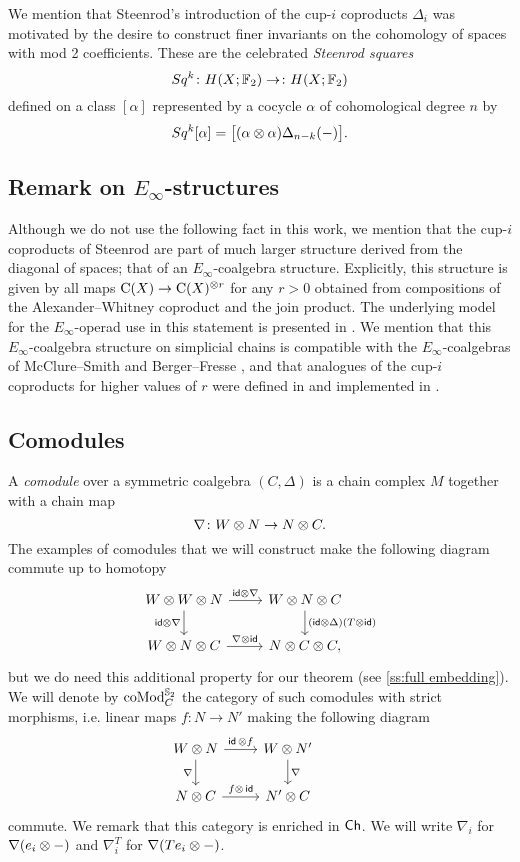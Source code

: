 We mention that Steenrod's introduction of the cup-$i$ coproducts $\Delta_i$ was motivated by the desire to construct finer invariants on the cohomology of spaces with mod 2 coefficients.
These are the celebrated \textit{Steenrod squares}
\[
Sq^k \colon H(X; {\mathbb{F}_2}) \to \colon H(X; {\mathbb{F}_2})
\]
defined on a class $[\alpha]$ represented by a cocycle $\alpha$ of cohomological degree $n$ by
\[
Sq^k [\alpha] = \big[ (\alpha \otimes \alpha) \Delta_{n-k}(-) \big].
\]

\subsection{Remark on $E_\infty$-structures}

Although we do not use the following fact in this work, we mention that the cup-$i$ coproducts of Steenrod are part of much larger structure derived from the diagonal of spaces; that of an $E_\infty$-coalgebra structure.
Explicitly, this structure is given by all maps $\operatorname{C}(X) \to \operatorname{C}(X)^{\otimes r}$ for any $r > 0$ obtained from compositions of the Alexander--Whitney coproduct and the join product.
The underlying model for the $E_\infty$-operad use in this statement is presented in \cite{medina2020prop1, medina2021prop2}.
We mention that this $E_\infty$-coalgebra structure on simplicial chains is compatible with the $E_\infty$-coalgebras of McClure--Smith \cite{mcclure2003multivariable} and Berger--Fresse \cite{berger2004combinatorial}, and that analogues of the cup-$i$ coproducts for higher values of $r$ were defined in \cite{medina2021may_st} and implemented in \cite{medina2021comch}.

\subsection{Comodules}

A \textit{comodule} over a symmetric coalgebra $(C, \Delta)$ is a chain complex $M$ together with a chain map
\[
\nabla \colon W \otimes N \to N \otimes C.
\]
The examples of comodules that we will construct make the following diagram commute up to homotopy
\[
\begin{tikzcd}
	W \ot W \ot N \arrow[r, "\id \ot \nabla"] \arrow[d, "\id \ot \nabla"'] &
	W \ot N \ot C \arrow[d, "(\id \ot \Delta)(T \ot \id)"] \\
	W \ot N \ot C \arrow[r, "\nabla \ot \id"] &
	N \ot C \ot C,
\end{tikzcd}
\]
but we do need this additional property for our theorem (see \cref{ss:full embedding}).
We will denote by $\operatorname{coMod}_C^{\mathbb{S}_2}$ the category of such comodules with strict morphisms, i.e. linear maps $f \colon N \to N'$ making the following diagram
\[
\begin{tikzcd}
	W \ot N \arrow[d, "\nabla"'] \arrow[r, "\id\, \ot f"] &
	W \ot N' \arrow[d, "\nabla"] & \\
	N \ot C \arrow[r, "f \ot\, \id"] &
	N' \ot C
\end{tikzcd}
\]
commute.
We remark that this category is enriched in $\mathsf{Ch}$.
We will write $\nabla_i$ for $\nabla(e_i \otimes -)$ and $\nabla_i^T$ for $\nabla(Te_i \otimes -)$.

